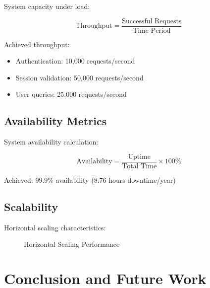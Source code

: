 \documentclass[11pt,a4paper]{article}
\begin{document}
System capacity under load:

\begin{equation}
    \text{Throughput} = \frac{\text{Successful Requests}}{\text{Time Period}}
\end{equation}

Achieved throughput:
\begin{itemize}
    \item Authentication: 10,000 requests/second
    \item Session validation: 50,000 requests/second
    \item User queries: 25,000 requests/second
\end{itemize}

\subsection{Availability Metrics}

System availability calculation:

\begin{equation}
    \text{Availability} = \frac{\text{Uptime}}{\text{Total Time}} \times 100\%
\end{equation}

Achieved: 99.9\% availability (8.76 hours downtime/year)

\subsection{Scalability}

Horizontal scaling characteristics:

\begin{figure}[h]
\centering
{}
\caption{Horizontal Scaling Performance}
\end{figure}

\section{Conclusion and Future Work}
\end{document}
